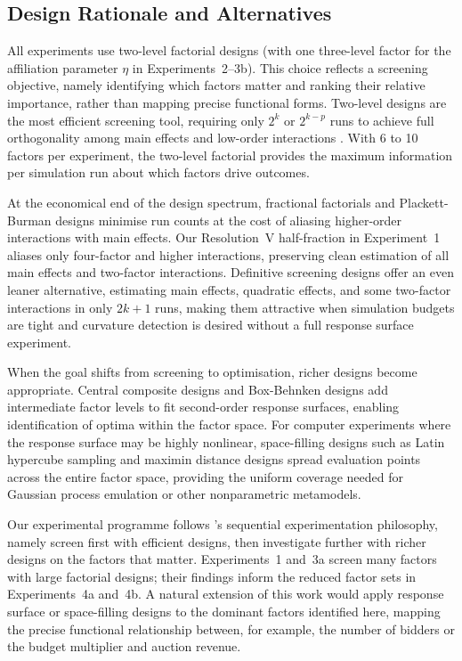 \subsection{Design Rationale and Alternatives}

All experiments use two-level factorial designs (with one three-level factor for the affiliation parameter $\eta$ in Experiments~2--3b). This choice reflects a screening objective, namely identifying which factors matter and ranking their relative importance, rather than mapping precise functional forms. Two-level designs are the most efficient screening tool, requiring only $2^k$ or $2^{k-p}$ runs to achieve full orthogonality among main effects and low-order interactions \citep{Box2005, Montgomery2017}. With 6 to 10 factors per experiment, the two-level factorial provides the maximum information per simulation run about which factors drive outcomes.

At the economical end of the design spectrum, fractional factorials and Plackett-Burman designs minimise run counts at the cost of aliasing higher-order interactions with main effects. Our Resolution~V half-fraction in Experiment~1 aliases only four-factor and higher interactions, preserving clean estimation of all main effects and two-factor interactions. Definitive screening designs \citep{JonesNachtsheim2011} offer an even leaner alternative, estimating main effects, quadratic effects, and some two-factor interactions in only $2k+1$ runs, making them attractive when simulation budgets are tight and curvature detection is desired without a full response surface experiment.

When the goal shifts from screening to optimisation, richer designs become appropriate. Central composite designs \citep{BoxWilson1951} and Box-Behnken designs \citep{BoxBehnken1960} add intermediate factor levels to fit second-order response surfaces, enabling identification of optima within the factor space. For computer experiments where the response surface may be highly nonlinear, space-filling designs such as Latin hypercube sampling \citep{McKayBeckmanConover1979} and maximin distance designs \citep{SantnerWilliamsNotz2018} spread evaluation points across the entire factor space, providing the uniform coverage needed for Gaussian process emulation or other nonparametric metamodels.

Our experimental programme follows \citeauthor{Box2005}'s sequential experimentation philosophy, namely screen first with efficient designs, then investigate further with richer designs on the factors that matter. Experiments~1 and~3a screen many factors with large factorial designs; their findings inform the reduced factor sets in Experiments~4a and~4b. A natural extension of this work would apply response surface or space-filling designs to the dominant factors identified here, mapping the precise functional relationship between, for example, the number of bidders or the budget multiplier and auction revenue.

